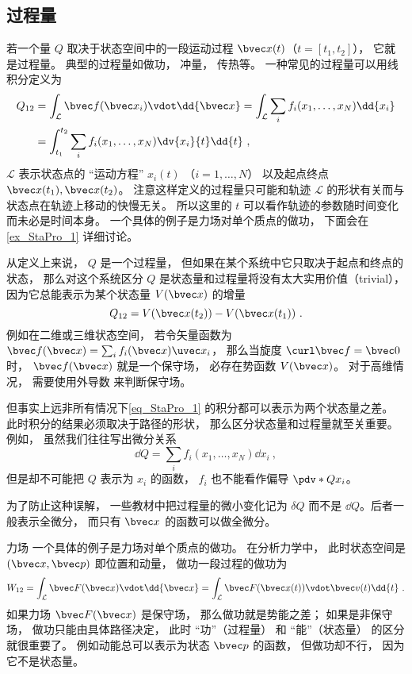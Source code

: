 \subsection{过程量}
若一个量 $Q$ 取决于状态空间中的一段运动过程 $\bvec x(t)$（$t = [t_1,t_2]$）， 它就是过程量。  典型的过程量如做功， 冲量， 传热等。 一种常见的过程量可以用线积分定义为
\begin{equation}\label{eq_StaPro_1}
\begin{aligned}
Q_{12} &= \int_{\mathcal L} \bvec f(\bvec x_i) \vdot \dd{\bvec x} = \int_{\mathcal L} \sum_i f_i(x_1, \dots, x_N) \dd{x_i}\\
&= \int_{t_1}^{t_2} \sum_i f_i(x_1, \dots, x_N) \dv{x_i}{t} \dd{t}~,
\end{aligned}
\end{equation}
$\mathcal L$ 表示状态点的 “运动方程” $x_i(t)$ （$i = 1,\dots, N$） 以及起点终点 $\bvec x(t_1), \bvec x(t_2)$。 注意这样定义的过程量只可能和轨迹 $\mathcal L$ 的形状有关而与状态点在轨迹上移动的快慢无关。 所以这里的 $t$ 可以看作轨迹的参数随时间变化而未必是时间本身。 一个具体的例子是力场对单个质点的做功， 下面会在\autoref{ex_StaPro_1} 详细讨论。


从定义上来说， $Q$ 是一个过程量， 但如果在某个系统中它只取决于起点和终点的状态， 那么对这个系统区分 $Q$ 是状态量和过程量将没有太大实用价值（trivial），因为它总能表示为某个状态量 $V(\bvec x)$ 的增量
\begin{equation}
Q_{12} = V(\bvec x(t_2)) - V(\bvec x(t_1))~.
\end{equation}
例如在二维或三维状态空间， 若令矢量函数为 $\bvec f(\bvec x) = \sum_i f_i(\bvec x) \uvec x_i$， 那么当旋度 $\curl \bvec f = \bvec 0$ 时， $\bvec f(\bvec x)$ 就是一个保守场， 必存在势函数 $V(\bvec x)$。 对于高维情况， 需要使用外导数 来判断保守场。

但事实上远非所有情况下\autoref{eq_StaPro_1} 的积分都可以表示为两个状态量之差。 此时积分的结果必须取决于路径的形状， 那么区分状态量和过程量就至关重要。 例如， 虽然我们往往写出微分关系
\begin{equation}
\dd Q = \sum_i f_i(x_1, \dots, x_N) \dd{x_i}~,
\end{equation}
但是却不可能把 $Q$ 表示为 $x_i$ 的函数， $f_i$ 也不能看作偏导 $\pdv*{Q}{x_i}$。

为了防止这种误解， 一些教材中把过程量的微小变化记为 $\delta Q$ 而不是 $\dd Q$。后者一般表示全微分， 而只有 $\bvec x$ 的函数可以做全微分。

\begin{example}{力场}\label{ex_StaPro_1}
一个具体的例子是力场对单个质点的做功。 在分析力学中， 此时状态空间是 $(\bvec x, \bvec p)$ 即位置和动量， 做功一段过程的做功为
\begin{equation}
W_{12} = \int_{\mathcal L} \bvec F(\bvec x) \vdot \dd{\bvec x} = \int_{\mathcal L} \bvec F(\bvec x(t)) \vdot \bvec v(t) \dd{t}~.
\end{equation}
如果力场 $\bvec F(\bvec x)$ 是保守场， 那么做功就是势能之差； 如果是非保守场， 做功只能由具体路径决定， 此时 “功”（过程量） 和 “能”（状态量） 的区分就很重要了。 例如动能总可以表示为状态 $\bvec p$ 的函数， 但做功却不行， 因为它不是状态量。
\end{example}

